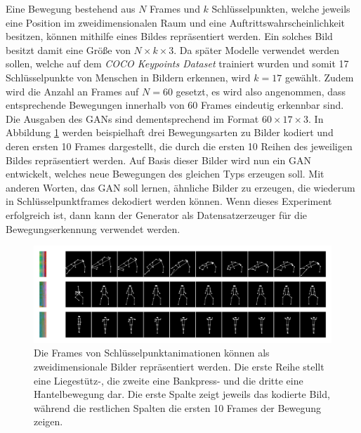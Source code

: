 Eine Bewegung bestehend aus $N$ Frames und $k$ Schlüsselpunkten, welche jeweils
eine Position im zweidimensionalen Raum und eine Auftrittswahrscheinlichkeit
besitzen, können mithilfe eines Bildes repräsentiert werden. Ein solches Bild
besitzt damit eine Größe von $N \times k \times 3$. Da später Modelle
verwendet werden sollen, welche auf dem \textit{COCO Keypoints Dataset}
\cite{lin2015microsoft} trainiert wurden und somit 17 Schlüsselpunkte von
Menschen in Bildern erkennen, wird $k = 17$ gewählt. Zudem wird die Anzahl an
Frames auf $N = 60$ gesetzt, es wird also angenommen, dass entsprechende
Bewegungen innerhalb von 60 Frames eindeutig erkennbar sind. Die Ausgaben des
GANs sind dementsprechend im Format $60 \times 17 \times 3$. In Abbildung
\ref{fig:motion-images} werden beispielhaft drei Bewegungsarten zu Bilder
kodiert und deren ersten 10 Frames dargestellt, die durch die ersten 10 Reihen
des jeweiligen Bildes repräsentiert werden. Auf Basis dieser Bilder wird nun ein
GAN entwickelt, welches neue Bewegungen des gleichen Typs erzeugen soll. Mit
anderen Worten, das GAN soll lernen, ähnliche Bilder zu erzeugen, die wiederum
in Schlüsselpunktframes dekodiert werden können. Wenn dieses Experiment
erfolgreich ist, dann kann der Generator als Datensatzerzeuger für die
Bewegungserkennung verwendet werden.

\begin{figure}
    \includegraphics[width=\textwidth]{images/motion_image.png}
    \caption{Die Frames von Schlüsselpunktanimationen können als
    zweidimensionale Bilder repräsentiert werden. Die erste Reihe stellt eine
    Liegestütz-, die zweite eine Bankpress- und die dritte eine Hantelbewegung
    dar. Die erste Spalte zeigt jeweils das kodierte Bild, während die
    restlichen Spalten die ersten 10 Frames der Bewegung zeigen.}
    \label{fig:motion-images}
\end{figure}

